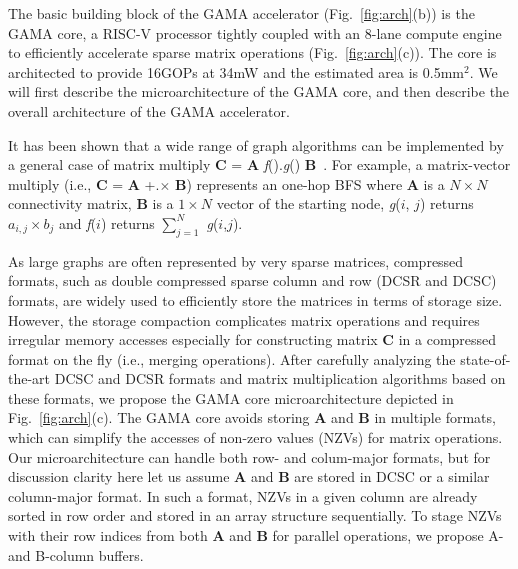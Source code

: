\noindent
The basic building block of the GAMA accelerator (Fig.~\ref{fig:arch}(b)) is the GAMA core,
a RISC-V processor  tightly coupled with an 8-lane compute engine to efficiently accelerate sparse matrix operations (Fig.~\ref{fig:arch}(c)).
The core is architected to provide 16GOPs at 34mW and the estimated area is 0.5mm$^2$.
We will first describe the microarchitecture of the GAMA core, and then describe the overall architecture of the GAMA accelerator.


It has been shown that a wide range of graph algorithms can be implemented by a general case of matrix multiply \textbf{C} = \textbf{A} \textit{f}().\textit{g}() \textbf{B}~\cite{graph:primitives}. 
For example, a matrix-vector multiply (i.e., \textbf{C} = \textbf{A} +.$\times$ \textbf{B}) represents an one-hop BFS 
where \textbf{A} is a $N \times N$ connectivity matrix, \textbf{B} is a $1 \times N$ vector of the starting node, 
\textit{g}($i$, $j$) returns $a_{i,j} \times b_{j}$ and \textit{f}($i$) returns $\sum_{j=1}^{N}$ \textit{g}($i$,$j$).


As large graphs are often represented by very sparse matrices, compressed formats, such as double compressed sparse column and row (DCSR and DCSC) formats, are widely used to efficiently store the matrices in terms of storage size.
However, the storage compaction complicates matrix operations and requires irregular memory accesses especially for constructing matrix \textbf{C} in a compressed format on the fly (i.e., merging operations).
After carefully analyzing the state-of-the-art DCSC and DCSR formats and matrix multiplication algorithms based on these formats, 
we propose the GAMA core microarchitecture depicted in Fig.~\ref{fig:arch}(c). The GAMA core avoids storing \textbf{A} and \textbf{B} in multiple formats, which can simplify the accesses of  non-zero values (NZVs) for matrix operations.
Our microarchitecture can handle both row- and colum-major formats, but for discussion clarity here let us assume  \textbf{A} and \textbf{B} are stored in DCSC or a similar column-major format.
In such a format, NZVs in a given column are already sorted in row order and stored in an array structure sequentially. 
To stage NZVs with their row indices from both \textbf{A} and \textbf{B} for parallel operations, we propose A- and B-column buffers. 

